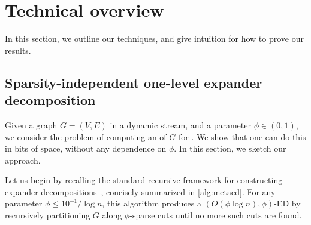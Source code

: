 \documentclass[epsfig,letter,11pt]{article}
\numberwithin{equation}{section}
\newcommand{\otil}{\tilde{O}}
\renewcommand{\tilde}{\widetilde}
\begin{document}
\section{Technical overview}
In this section, we outline our techniques, and give intuition for how to prove our results.
\subsection{Sparsity-independent one-level expander decomposition}
\label{sec:techoverviewub}
Given a graph $G=(V,E)$ in a  dynamic stream, and a parameter $\phi \in (0,1)$, we consider the problem of computing an  of $G$ for . We show that one can do this in \smash{$\otil(n)$} bits of space, without any dependence on $\phi$.
In this section, we sketch our approach.

Let us begin by recalling the standard recursive framework for constructing expander decompositions~\cite{kvv,Trevisan08,stspectral}, concisely summarized in \cref{alg:metaed}. For any parameter $\phi \le 10^{-1}/\log n$, this algorithm produces a $(O(\phi \log n), \phi)$-ED by recursively partitioning $G$ along $\phi$-sparse cuts until no more such cuts are found.
\end{document}
